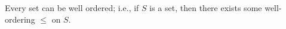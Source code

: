 Every set can be well ordered; i.e., if \(S\) is a set, then there exists some well-ordering \(\leq\) on \(S\).